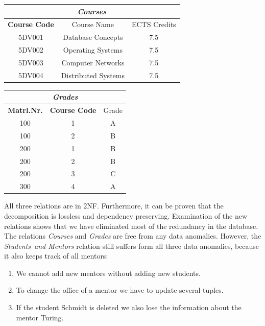 \begin{center}
\begin{tabular}[h]{|c|c|c|}
\hline
\multicolumn{3}{|c|}{\textit{Courses}} \\ \hline
\textbf{Course Code} & Course Name & ECTS Credits \\
\hline \hline
5DV001 & Database Concepts   & 7.5 \\ 
5DV002 & Operating  Systems  & 7.5 \\
5DV003 & Computer  Networks  & 7.5 \\
5DV004 & Distributed Systems & 7.5 \\ \hline
\end{tabular}
\end{center}

\begin{center}
\begin{tabular}[h]{|c|c|c|}
  \hline
  \multicolumn{3}{|c|}{\textit{Grades}} \\ \hline
  \textbf{Matrl.Nr.} & \textbf{Course Code} & Grade \\
  \hline \hline
  100 & 1 & A \\ 
  100 & 2 & B \\
  200 & 1 & B \\
  200 & 2 & B \\
  200 & 3 & C \\
  300 & 4 & A \\ \hline
\end{tabular}
\end{center}

All three relations are in 2NF. Furthermore, it can be proven that the
decomposition is lossless and dependency preserving. 
Examination of the new relations shows that we have eliminated most of the redundancy 
in the database. The relations \textit{Courses} and \textit{Grades} are free
from any data anomalies. However, the \textit{Students~and Mentors} relation still suffers form all three
data anomalies, because it also keeps track of all mentors:
\begin{enumerate}
  \item We cannot add new mentors without adding new students.
  \item To change the office of a mentor we have to update several tuples.
  \item If the student Schmidt is deleted we also lose the information about the mentor Turing.
\end{enumerate}
 
